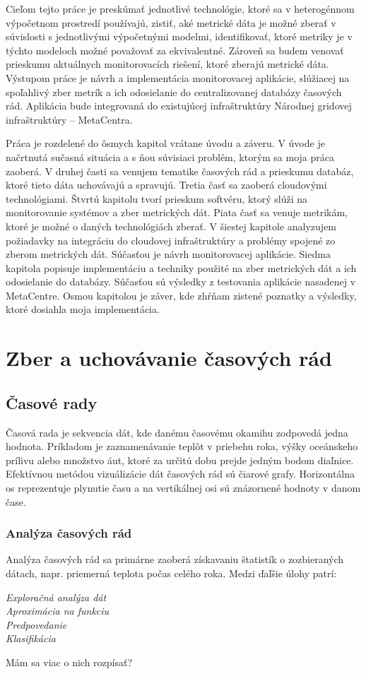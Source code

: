 \documentclass[11pt,final,oneside]{fithesis}
\begin{document}
Cieľom tejto práce je preskúmať jednotlivé technológie, ktoré sa v heterogénnom výpočetnom prostredí používajú, zistiť, aké metrické dáta je možné zberať v súvislosti s jednotlivými výpočetnými modelmi,
identifikovať, ktoré metriky je v týchto modeloch možné považovať za ekvivalentné. Zároveň sa budem venovať prieskumu aktuálnych monitorovacích riešení, ktoré zberajú metrické dáta. Výstupom práce je návrh
a implementácia monitorovacej aplikácie, slúžiacej na spoľahlivý zber metrík a ich odosielanie do centralizovanej databázy časových rád. Aplikácia bude integrovaná do existujúcej infraštruktúry Národnej 
gridovej infraštruktúry – MetaCentra.

Práca je rozdelené do ôsmych kapitol vrátane úvodu a záveru. V úvode je načrtnutá sučasná situácia a s ňou súvisiaci problém, ktorým sa moja práca zaoberá.  V druhej časti sa venujem tematike časových rád a
prieskumu databáz, ktoré tieto dáta uchovávajú a spravujú. Tretia časť sa zaoberá cloudovými technológiami. Štvrtú kapitolu tvorí prieskum softvéru, ktorý slúži na monitorovanie systémov a zber metrických dát. 
Piata časť sa venuje metrikám, ktoré je možné o daných technológiách zberať. V šiestej kapitole analyzujem požiadavky na integráciu do cloudovej infraštruktúry a problémy spojené zo zberom metrických 
dát. Súčasťou je návrh monitorovacej aplikácie. Siedma kapitola popisuje implementáciu a techniky použité na zber metrických dát a ich odosielanie do databázy. Súčasťou sú výsledky z testovania aplikácie
nasadenej v MetaCentre. Osmou kapitolou je záver, kde zhŕňam zistené poznatky a výsledky, ktoré dosiahla moja implementácia.

\chapter{Zber a uchovávanie časových rád}
\section{Časové rady}
Časová rada je sekvencia dát, kde danému časovému okamihu zodpovedá jedna hodnota. Príkladom je zaznamenávanie teplôt v priebehu roka, výšky oceánskeho prílivu alebo množstvo áut, ktoré za určitú dobu
prejde jedným bodom diaľnice. Efektívnou metódou vizuálizácie dát časových rád sú čiarové grafy. Horizontálna os reprezentuje plynutie času a na vertikálnej osi sú znázornené hodnoty v danom čase.

\subsection{Analýza časových rád}
Analýza časových rád sa primárne zaoberá získavaniu štatistík o zozbieraných dátach, napr. priemerná teplota počas celého roka. Medzi ďaľšie úlohy patrí:
\begin{description}
\item[\emph{Exploračná analýza dát}]
\item[\emph{Aproximácia na funkciu}] 
\item[\emph{Predpovedanie}] 
\item[\emph{Klasifikácia}] 
\end{description}
Mám sa viac o nich rozpísať?
\end{document}
